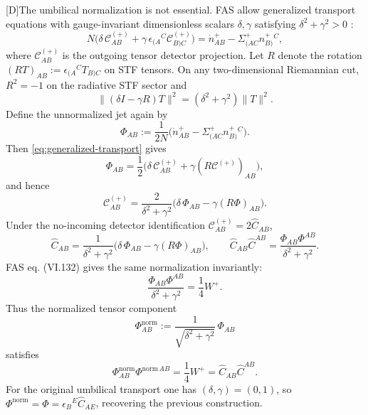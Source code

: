 \documentclass[11pt,a4paper]{article}
\newcommand{\cC}{\mathcal{C}}
\newcommand{\statusD}{\textsf{[D]}}
\begin{document}
\statusD The umbilical normalization is not essential.  FAS allow generalized transport equations with gauge-invariant dimensionless scalars \(\delta,\gamma\) satisfying \(\delta^2+\gamma^2>0\) \cite{fabSen2022asymptotic}:
\begin{equation}\label{eq:generalized-transport}
  N\big(
    \delta\,\cC^{(+)}_{AB}
    +\gamma\,\epsilon_{(A}{}^{C}\cC^{(+)}_{B)C}
  \big)
  =
  \dot n^+_{AB}-\Sigma^+_{(AC}n^+_{B)}{}^C ,
\end{equation}
where \(\cC^{(+)}_{AB}\) is the outgoing tensor detector projection.  Let \(R\) denote the rotation \((RT)_{AB}:=\epsilon_{(A}{}^{C}T_{B)C}\) on STF tensors.  On any two-dimensional Riemannian cut, \(R^2=-1\) on the radiative STF sector and
\begin{equation}
  \big\|(\delta I-\gamma R)T\big\|^2
  =
  (\delta^2+\gamma^2)\|T\|^2 .
\end{equation}
Define the unnormalized jet again by
\begin{equation}
  \Phi_{AB}
  :=
  \frac{1}{2N}
  \big(
    \dot n^+_{AB}-\Sigma^+_{(AC}n^+_{B)}{}^C
  \big).
\end{equation}
Then \eqref{eq:generalized-transport} gives
\begin{equation}
  \Phi_{AB}
  =
  \frac12\big(\delta\,\cC^{(+)}_{AB}+\gamma(R\cC^{(+)})_{AB}\big),
\end{equation}
and hence
\begin{equation}\label{eq:generalized-detector-inversion}
  \cC^{(+)}_{AB}
  =
  \frac{2}{\delta^2+\gamma^2}
  \big(\delta\,\Phi_{AB}-\gamma(R\Phi)_{AB}\big).
\end{equation}
Under the no-incoming detector identification \(\cC^{(+)}_{AB}=2\hat C_{AB}\),
\begin{equation}\label{eq:generalized-C-inversion}
  \hat C_{AB}
  =
  \frac{1}{\delta^2+\gamma^2}
  \big(\delta\,\Phi_{AB}-\gamma(R\Phi)_{AB}\big),
  \qquad
  \hat C_{AB}\hat C^{AB}
  =
  \frac{\Phi_{AB}\Phi^{AB}}{\delta^2+\gamma^2}.
\end{equation}
FAS eq. (VI.132) gives the same normalization invariantly:
\begin{equation}\label{eq:generalized-W-normalization}
  \frac{\Phi_{AB}\Phi^{AB}}{\delta^2+\gamma^2}
  =
  \frac14 W^+ .
\end{equation}
Thus the normalized tensor component
\begin{equation}\label{eq:Phi-normalized}
  \Phi^{\mathrm{norm}}_{AB}
  :=
  \frac{1}{\sqrt{\delta^2+\gamma^2}}\,\Phi_{AB}
\end{equation}
satisfies
\begin{equation}
  \Phi^{\mathrm{norm}}_{AB}\Phi^{\mathrm{norm}\,AB}
  =
  \frac14 W^+
  =
  \hat C_{AB}\hat C^{AB}.
\end{equation}
For the original umbilical transport one has \((\delta,\gamma)=(0,1)\), so \(\Phi^{\mathrm{norm}}=\Phi=\epsilon_B{}^E\hat C_{AE}\), recovering the previous construction.
\end{document}
